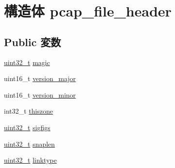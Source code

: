 \hypertarget{structpcap__file__header}{
\section{構造体 pcap\_\-file\_\-header}
\label{structpcap__file__header}
}
\subsection*{Public 変数}
\begin{DoxyCompactItemize}
\item 
\hyperlink{Type_8hh_a435d1572bf3f880d55459d9805097f62}{uint32\_\-t} \hyperlink{structpcap__file__header_a57f54349f4fd1cbbb52058812e146af2}{magic}
\item 
uint16\_\-t \hyperlink{structpcap__file__header_ae45ca4ea27a897d2c46eb088e6b139f8}{version\_\-major}
\item 
uint16\_\-t \hyperlink{structpcap__file__header_a166f22ce4b25488997425405d2a6e42d}{version\_\-minor}
\item 
int32\_\-t \hyperlink{structpcap__file__header_aeb4fa0ab3357f30ebf3be827f6757958}{thiszone}
\item 
\hyperlink{Type_8hh_a435d1572bf3f880d55459d9805097f62}{uint32\_\-t} \hyperlink{structpcap__file__header_a73f44d04516e34b9edbbf936f10cb81d}{sigfigs}
\item 
\hyperlink{Type_8hh_a435d1572bf3f880d55459d9805097f62}{uint32\_\-t} \hyperlink{structpcap__file__header_ac2fbfe5646126df83713fb2d42428ed8}{snaplen}
\item 
\hyperlink{Type_8hh_a435d1572bf3f880d55459d9805097f62}{uint32\_\-t} \hyperlink{structpcap__file__header_af22b4653595c0c7bbf27ceabb7c5dcc8}{linktype}
\end{DoxyCompactItemize}


